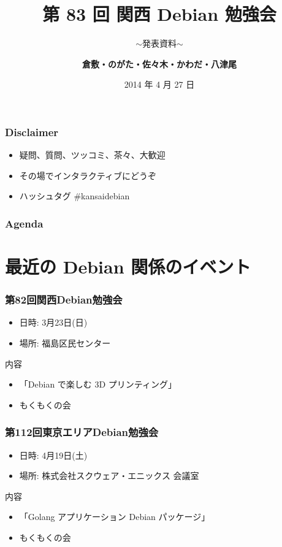 \documentclass[cjk,dvipdfmx,10pt,compress,%
hyperref={bookmarks=true,bookmarksnumbered=true,bookmarksopen=false,%
colorlinks=false,%
pdftitle={第 82 回 関西 Debian 勉強会},%
pdfauthor={倉敷・のがた・佐々木・かわだ・八津尾},%
pdfsubject={資料},%
}]{beamer}
\title{第 83 回 関西 Debian 勉強会}
\subtitle{$\sim$発表資料$\sim$}
\author[かわだ てつたろう]{{\large\bf 倉敷・のがた・佐々木・かわだ・八津尾}}
\institute[Debian JP]{{\normalsize\tt 関西 Debian 勉強会}}
\date{{\small 2014 年 4 月 27 日}}
\begin{document}
\settitleslide
\begin{frame}
\titlepage
\end{frame}
\setdefaultslide

\begin{frame}[fragile]
  \frametitle{Disclaimer}
  \begin{itemize}
  \item 疑問、質問、ツッコミ、茶々、\alert{大歓迎}
  \item その場でインタラクティブにどうぞ
  \item ハッシュタグ \#kansaidebian
\end{itemize}
\end{frame}

\begin{frame}[fragile]
\frametitle{Agenda}

\tableofcontents

\end{frame}

\section{最近の Debian 関係のイベント}


\begin{frame}[fragile]
  \frametitle{第82回関西Debian勉強会}
  \begin{itemize}
  \item 日時: 3月23日(日)
  \item 場所: 福島区民センター
  \end{itemize}
  \begin{block}{内容}
    \begin{itemize}
    \item 「Debian で楽しむ 3D プリンティング」
    \item もくもくの会
    \end{itemize}
  \end{block}
\end{frame}

\begin{frame}[fragile]
  \frametitle{第112回東京エリアDebian勉強会}
  \begin{itemize}
  \item 日時: 4月19日(土)
  \item 場所: 株式会社スクウェア・エニックス 会議室
  \end{itemize}
  \begin{block}{内容}
    \begin{itemize}
    \item 「Golang アプリケーション Debian パッケージ」
    \item もくもくの会
    \end{itemize}
  \end{block}
\end{frame}
\end{document}
